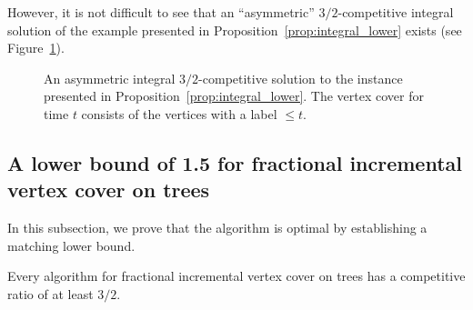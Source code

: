 \documentclass[a4paper,USenglish,cleveref,autoref,thm-restate,pdfa]{lipics-v2021}
\let\leq\leqslant
\begin{document}
However, it is not difficult to see that an ``asymmetric'' $3/2$-competitive integral solution of the example presented in Proposition~\ref{prop:integral_lower} exists (see Figure~\ref{fig:asymmetric_solution}).

\begin{figure}
\begin{center}
\end{center}
\caption{An asymmetric integral $3/2$-competitive solution to the instance presented in Proposition~\ref{prop:integral_lower}. The vertex cover for time $t$ consists of the vertices with a label $\leq t$.}
\label{fig:asymmetric_solution}
\end{figure}

\subsection{A lower bound of 1.5 for fractional incremental vertex cover on trees}

In this subsection, we prove that the algorithm \twochild is optimal by establishing a matching lower bound.

\begin{theorem}\label{thm:lower-bound}
Every algorithm for fractional incremental vertex cover on trees has a competitive ratio of at least $3/2$.
\end{theorem}
\end{document}
